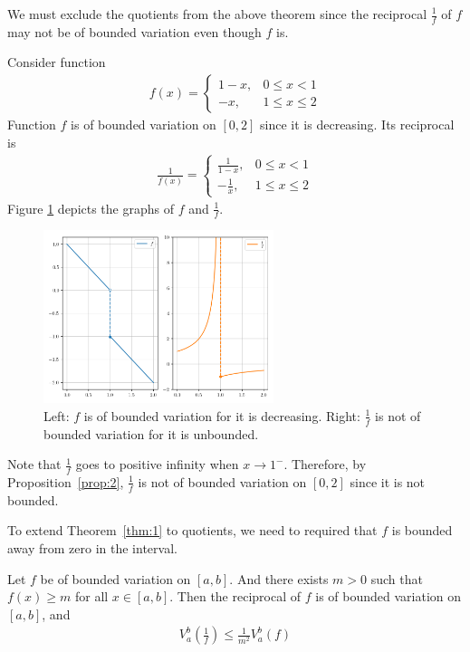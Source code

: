 \documentclass[thmcnt=section, color=blue, 12pt]{my-elegantbook}
\begin{document}
We must exclude the quotients from the above theorem
since the reciprocal $\frac{1}{f}$ of $f$ may not be of bounded variation
even though $f$ is.

\begin{example}
	Consider function
	\begin{align*}
		f(x) = \begin{cases}
			       1-x, & 0 \leq x < 1     \\
			       -x,  & 1 \leq x  \leq 2
		       \end{cases}
	\end{align*}
	Function $f$ is of bounded variation on $[0, 2]$ since it is decreasing.
	Its reciprocal is
	\begin{align*}
		\frac{1}{f(x)} = \begin{cases}
			                 \frac{1}{1-x}, & 0 \leq x < 1     \\
			                 -\frac{1}{x},  & 1 \leq x  \leq 2
		                 \end{cases}
	\end{align*}
	Figure \ref{fig:3} depicts the graphs of $f$ and $\frac{1}{f}$.
	\begin{figure}[H]
		\centering
		\includegraphics[width=0.6\textwidth]{figures/reciprocal-not-of-bounded-variation.png}
		\caption{Left: $f$ is of bounded variation for it is decreasing. Right: $\frac{1}{f}$ is not of bounded variation for it is unbounded.}
		\label{fig:3}
	\end{figure}
	Note that $\frac{1}{f}$ goes to positive infinity when $x \to 1^-$.
	Therefore, by Proposition~\ref{prop:2}, $\frac{1}{f}$ is not of bounded variation on $[0, 2]$
	since it is not bounded.
\end{example}

To extend Theorem~\ref{thm:1} to quotients,
we need to required that $f$ is bounded away from zero in the interval.

\begin{theorem}
	Let $f$ be of bounded variation on $[a, b]$.
	And there exists $m > 0$ such that $f(x) \geq m$ for all $x \in [a, b]$.
	Then the reciprocal of $f$ is of bounded variation on $[a, b]$, and
	\begin{align*}
		V_a^b ( \frac{1}{f} )
		\leq \frac{1}{m^2} V_a^b (f)
	\end{align*}
\end{theorem}
\end{document}
